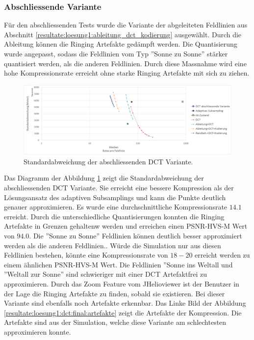 \subsubsection{Abschliessende Variante}
Für den abschliessenden Tests wurde die Variante der abgeleiteten Feldlinien aus Abschnitt \ref{resultate:loesung1:ableitung_dct_kodierung} ausgewählt. Durch die Ableitung können die Ringing Artefakte gedämpft werden. Die Quantisierung wurde angepasst, sodass die Feldlinien vom Typ ''Sonne zu Sonne'' stärker quantisiert werden, als die anderen Feldlinien. Durch diese Massnahme wird eine hohe Kompressionsrate erreicht ohne starke Ringing Artefakte mit sich zu ziehen.
\begin{figure}[!htbp]
	\center	\includegraphics[width=1\textwidth,keepaspectratio]{./pictures/resultate/loesung1/loesung1-12/resultate.png}
	\caption{Standardabweichung der abschliessenden DCT Variante.}	\label{resultate:loesung1:dct:abschliessend:standardabweichung}
\end{figure} 
Das Diagramm der Abbildung \ref{resultate:loesung1:dct:abschliessend:standardabweichung} zeigt die Standardabweichung der abschliessenden DCT Variante. Sie erreicht eine bessere Kompression als der Lösungsansatz des adaptiven Subsamplings und kann die Punkte deutlich genauer approximieren. Es wurde eine durchschnittliche Kompressionsrate $14.1$ erreicht.
Durch die unterschiedliche Quantisierungen konnten die Ringing Artefakte in Grenzen gehaltenw werden und erreichen einen PSNR-HVS-M  Wert von $94.0$. Die ''Sonne zu Sonne'' Feldlinien können deutlich besser approximiert werden als die anderen Feldlinien.. Würde die Simulation nur aus diesen Feldlinien bestehen, könnte eine Kompressionsrate von $18-20$ erreicht werden zu einem ähnlichen PSNR-HVS-M Wert. Die Feldlinien ''Sonne ins Weltall und ''Weltall zur Sonne'' sind schwieriger mit einer DCT Artefaktfrei zu approximieren.  Durch das Zoom Feature vom JHelioviewer ist der Benutzer in der Lage die Ringing Artefakte zu finden, sobald sie existieren.
Bei dieser Variante sind ebenfalls noch Artefakte erkennbar. Das Linke Bild der Abbildung \ref{resultate:loesung1:dct:final:artefakte} zeigt die Artefakte der Kompression. Die Artefakte sind aus der Simulation, welche diese Variante am schlechtesten approximieren konnte.

